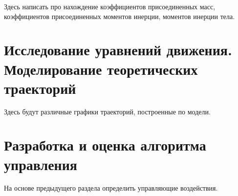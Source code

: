 Здесь написать про нахождение коэффициентов присоединенных масс, коэффициентов присоединенных моментов инерции, моментов инерции тела.


\section{Исследование уравнений движения. Моделирование теоретических траекторий}

Здесь будут различные графики траекторий, построенные по модели. 

\section{Разработка и оценка алгоритма управления}

На основе предыдущего раздела определить управляющие воздействия.



